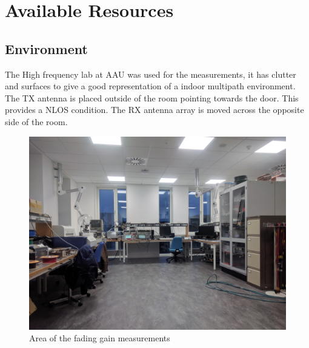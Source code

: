 \chapter{Available Resources}

\section{Environment} \label{Environment}
The High frequency lab at \gls{AAU} was used for the measurements, it has  clutter and surfaces to give a good representation of a indoor multipath environment. The TX antenna is placed outside of the room pointing towards the door. This provides a NLOS condition. The RX antenna array is moved across the opposite side of the room.


\begin{figure}[H]
  \centering
  \begin{minipage}[H]{0.4\textwidth}
    \includegraphics[width=\textwidth]{pictures/Measurement/walking_meas.jpg}
    \caption{Area of the fading gain measurements}
    \label{walk_area}
  \end{minipage}
  \hfill
  \begin{minipage}[H]{0.5\textwidth}

\end{minipage}
\end{figure}
